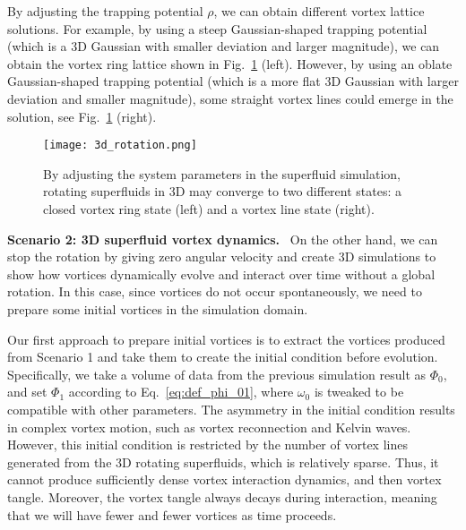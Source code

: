 \documentclass[10pt,journal,compsoc,twoside]{IEEEtran}
\begin{document}
	By adjusting the trapping potential $\rho$, we can obtain different vortex lattice solutions.
	For example, by using a steep Gaussian-shaped trapping potential (which is a 3D Gaussian with smaller deviation and larger magnitude), we can obtain the vortex ring lattice shown in Fig.~\ref{fig:3d_rotation} (left).
	However, by using an oblate Gaussian-shaped trapping potential (which is a more flat 3D Gaussian with larger deviation and smaller magnitude), some straight vortex lines could emerge in the solution, see Fig.~\ref{fig:3d_rotation} (right).
	
	\begin{figure}[t]
		\centering
		\texttt{[image: 3d\_rotation.png]}
		\caption{By adjusting the system parameters in the superfluid simulation, rotating superfluids in 3D may converge to two different states: a closed vortex ring state (left) and a vortex line state (right).}
		\label{fig:3d_rotation}
	\end{figure}
	
	
	
	\vspace{0.15cm}
	\noindent
	\textbf{Scenario 2: 3D superfluid vortex dynamics.} \
	On the other hand, we can stop the rotation by giving zero angular velocity and create 3D simulations to show how vortices dynamically evolve and interact over time without a global rotation.
	In this case, since vortices do not occur spontaneously, we need to prepare some initial vortices in the simulation domain.
	
	Our first approach to prepare initial vortices is to extract the vortices produced from Scenario 1 and take them to create the initial condition before evolution.
	Specifically, we take a volume of data from the previous simulation result as $\Phi_0$, and set $\Phi_1$ according to Eq.~\ref{eq:def_phi_01}, where $\omega_0$ is tweaked to be compatible with other parameters.
	The asymmetry in the initial condition results in complex vortex motion, such as vortex reconnection and Kelvin waves.
	However, this initial condition is restricted by the number of vortex lines generated from the 3D rotating superfluids, which is relatively sparse. 
	Thus, it cannot produce sufficiently dense vortex interaction dynamics, and then vortex tangle.
	Moreover, the vortex tangle always decays during interaction, meaning that we will have fewer and fewer vortices as time proceeds.
	
\end{document}
